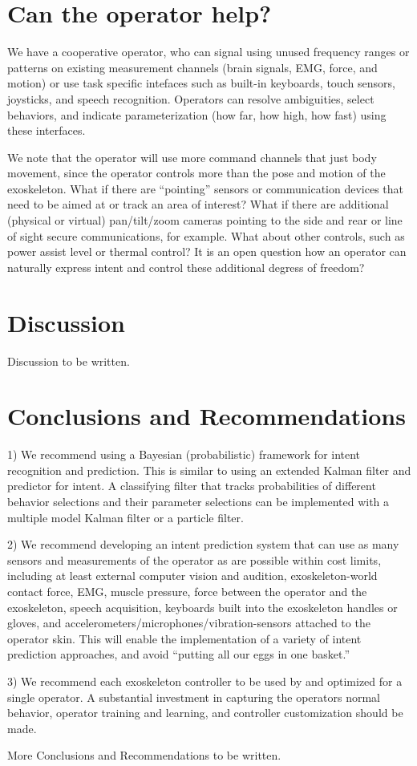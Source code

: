 \documentclass[letterpaper,12pt,fullpage]{article}
\begin{document}
\section{Can the operator help?}

We have a cooperative operator, who can signal using unused frequency
ranges or patterns on existing measurement
channels (brain signals, EMG, force, and motion) or use 
task specific intefaces such as built-in keyboards, touch sensors, joysticks,
and speech recognition.
Operators can resolve ambiguities, select behaviors, and indicate
parameterization (how far, how high, how fast) using these interfaces.

We note that the operator will use more command channels that just
body movement, since
the operator controls more than the pose and motion of the
exoskeleton. What if there are ``pointing'' sensors or communication
devices that need to be aimed at or track an area of interest? What if
there are additional (physical or virtual) pan/tilt/zoom cameras
pointing to the side and rear or line of sight secure communications,
for example. What about other controls, such as power assist level or
thermal control? It is an open question
how an operator can naturally express intent and
control these additional degress of freedom?

\section{Discussion}

Discussion to be written.

\section{Conclusions and Recommendations}

1) We recommend using a Bayesian (probabilistic) framework for intent recognition
and prediction. This is similar to using an extended
Kalman filter and predictor for intent.
A classifying filter that tracks probabilities of different behavior selections
and their parameter selections can be implemented with a multiple model Kalman
filter or a particle filter.

2) We recommend developing an intent prediction system that can use
as many sensors and measurements of the operator as are possible within cost limits,
including at least external computer vision and audition, exoskeleton-world contact
force,
EMG, muscle pressure, force between the operator and the
exoskeleton,
speech acquisition, keyboards built into the exoskeleton handles or gloves,
and accelerometers/microphones/vibration-sensors attached to the operator skin.
This will enable the implementation of a variety of intent prediction approaches,
and avoid ``putting all our eggs in one basket.''

3) We recommend each exoskeleton controller
to be used by and optimized for a single operator.
A substantial investment in capturing the operators normal behavior,
operator training and learning, and controller customization should be made.

More Conclusions and Recommendations to be written.



\end{document}
